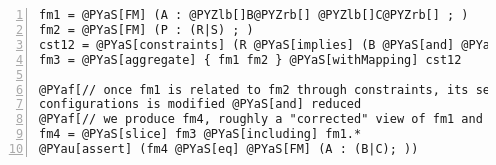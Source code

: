 \documentclass{article}
\begin{document}
\section*{}

\begin{Verbatim}[commandchars=@\[\],numbers=left,firstnumber=1,stepnumber=1]
fm1 = @PYaS[FM] (A : @PYZlb[]B@PYZrb[] @PYZlb[]C@PYZrb[] ; )
fm2 = @PYaS[FM] (P : (R|S) ; )
cst12 = @PYaS[constraints] (R @PYaS[implies] (B @PYaS[and] @PYaS[not] C); S @PYaS[implies] (C @PYaS[and] @PYaS[not] B) ; )
fm3 = @PYaS[aggregate] { fm1 fm2 } @PYaS[withMapping] cst12

@PYaf[// once fm1 is related to fm2 through constraints, its set of]
configurations is modified @PYaS[and] reduced
@PYaf[// we produce fm4, roughly a "corrected" view of fm1 and its set of configurations]
fm4 = @PYaS[slice] fm3 @PYaS[including] fm1.*   
@PYau[assert] (fm4 @PYaS[eq] @PYaS[FM] (A : (B|C); )) 
\end{Verbatim}
\end{document}
